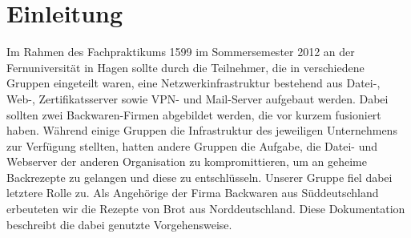 \section{Einleitung}

Im Rahmen des Fachpraktikums 1599 im Sommersemester 2012 an der Fernuniversität in Hagen sollte durch die Teilnehmer, die in verschiedene Gruppen eingeteilt waren, eine Netzwerkinfrastruktur bestehend aus Datei-, Web-, Zertifikatsserver sowie VPN- und Mail-Server aufgebaut werden. Dabei sollten zwei Backwaren-Firmen abgebildet werden, die vor kurzem fusioniert haben. Während einige Gruppen die Infrastruktur des jeweiligen Unternehmens zur Verfügung stellten, hatten andere Gruppen die Aufgabe, die Datei- und Webserver der anderen Organisation zu kompromittieren, um an geheime Backrezepte zu gelangen und diese zu entschlüsseln.
Unserer Gruppe  fiel dabei letztere Rolle zu. Als Angehörige der Firma  Backwaren{} aus Süddeutschland erbeuteten wir die Rezepte von \Mayer Brot{} aus Norddeutschland.
Diese Dokumentation beschreibt die dabei genutzte Vorgehensweise.



